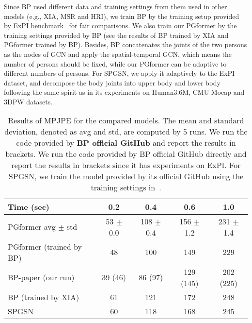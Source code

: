 \documentclass[10pt,twocolumn,letterpaper]{article}
\begin{document}
Since BP used different data and training settings from them used in other models (e.g., XIA, MSR and HRI), we train BP by the training setup provided by ExPI benchmark~\cite{guo2021multi} for fair comparisons. 
We also train our PGformer by the training settings provided by BP (see the results of BP trained by XIA and PGformer trained by BP). 
Besides, BP concatenates the joints of the two persons as the nodes of GCN and apply the spatial-temporal GCN, which means the number of persons should be fixed, while our PGformer can be adaptive to different numbers of persons. 
For SPGSN, we apply it adaptively to the ExPI dataset, and decompose the body joints into upper body and lower body following the same spirit as in its experiments on Human3.6M, CMU Mocap and 3DPW datasets. 

\begin{table}[ht]
    \setlength\tabcolsep{2.8pt}
    \caption{Results of MPJPE for the compared models. 
    The mean and standard deviation, denoted as avg and std, are computed by 5 runs. 
    We run the code provided by \textbf{BP official GitHub} and report the results in brackets.
    We run the code provided by BP official GitHub directly and report the results in brackets since it has experiments on ExPI. 
    For SPGSN, we train the model provided by its official GitHub using the training settings in~\cite{guo2021multi}.
    }
    \vskip -0.05in
    \label{tab:more_results}
    \begin{center}
    \footnotesize
\begin{tabular}{l|cccc}
\hline
        Time (sec) & 0.2 & 0.4 & 0.6 & 1.0 \\
        \hline
        PGformer avg $\pm$ std & 53 $\pm$ 0.0 & 108 $\pm$ 0.4 & 156 $\pm$ 1.2 & 231 $\pm$ 1.4 \\
        PGformer (trained by BP) & 48 & 100 & 149 & 229 \\
        BP-paper (our run) & 39 (46) & 86 (97) & 129 (145) & 202 (225) \\
BP (trained by XIA) & 61 & 121 & 172 & 248 \\
        SPGSN & 60 & 118 & 168 & 245 \\ 
        \hline
    \end{tabular}
    \end{center}
    \vskip -0.2in
\end{table}
\end{document}
